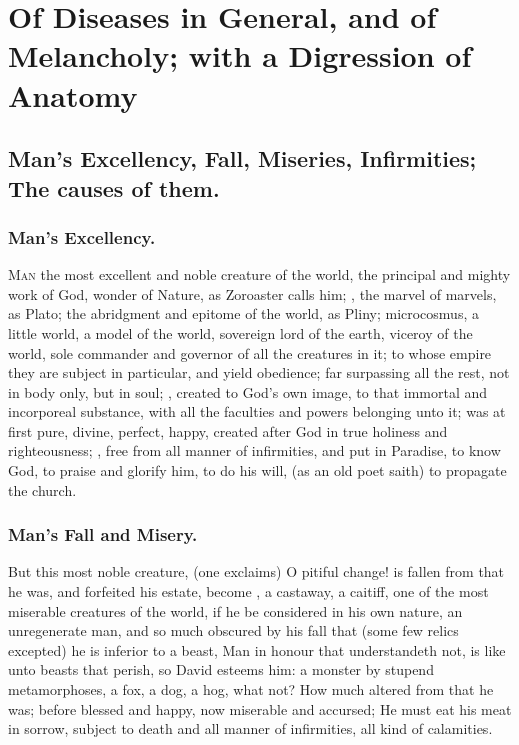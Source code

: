 \chapter[Of Diseases and Melancholy]{Of Diseases in General, and of Melancholy; with a Digression of Anatomy}
{%
\section[Man's Excellency, Fall, Miseries]{Man's Excellency, Fall, Miseries, Infirmities; The causes of them.}

\subsection{Man's Excellency.}
\lettrine[lines=4,findent=5pt,nindent=0pt]{M}{an} the most excellent and noble creature of the world, the principal and mighty work of God, wonder of Nature, 
as Zoroaster calls him; , the marvel of marvels,
as Plato; the abridgment and epitome of the world,
as Pliny; microcosmus, a little world, a model of the world, sovereign lord of the earth, viceroy of the world, sole commander and governor of all the creatures in it; to whose empire they are subject in particular, and yield obedience; far surpassing all the rest, not in body only, but in soul; , created to God's own image, to that immortal and incorporeal substance, with all the faculties and powers belonging unto it; was at first pure, divine, perfect, happy, created after God in true holiness and righteousness; , free from all manner of infirmities, and put in Paradise, to know God, to praise and glorify him, to do his will,  (as an old poet saith) to propagate the church.

\subsection{Man's Fall and Misery.}
But this most noble creature,  (one exclaims) O pitiful change! is fallen from that he was, and forfeited his estate, become , a castaway, a caitiff, one of the most miserable creatures of the world, if he be considered in his own nature, an unregenerate man, and so much obscured by his fall that (some few relics excepted) he is inferior to a beast, Man in honour that understandeth not, is like unto beasts that perish, so David esteems him: a monster by stupend metamorphoses, a fox, a dog, a hog, what not?  How much altered from that he was; before blessed and happy, now miserable and accursed; He must eat his meat in sorrow, subject to death and all manner of infirmities, all kind of calamities.

}
